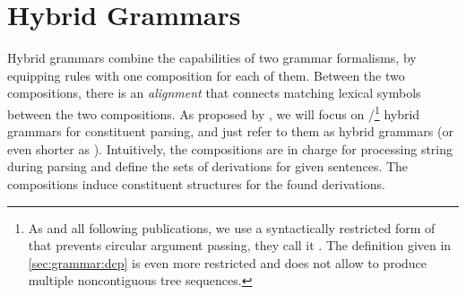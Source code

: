 \documentclass[../../document.tex]{subfiles}
\begin{document}
    \section{Hybrid Grammars}\label{sec:grammar:hybrid}
    Hybrid grammars \citep{Ned14,Geb17,Geb20} combine the capabilities of two grammar formalisms, by equipping rules with one composition for each of them.
    Between the two compositions, there is an \emph{alignment} that connects matching lexical symbols between the two compositions.
    As proposed by \citet{Ned14}, we will focus on /\footnote{
        As \cite{Ned14} and all following publications, we use a syntactically restricted form of  that prevents circular argument passing, they call it .
        The definition given in \cref{sec:grammar:dcp} is even more restricted and does not allow to produce multiple noncontiguous tree sequences.
    } hybrid grammars for constituent parsing, and just refer to them as hybrid grammars (or even shorter as ).
    Intuitively, the  compositions are in charge for processing string during parsing and define the sets of derivations for given sentences.
    The  compositions induce constituent structures for the found derivations.
\end{document}
